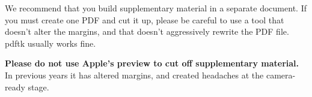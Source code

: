 \documentclass{article}
\begin{document}
    We recommend that you build supplementary material in a separate document.
    If you must create one PDF and cut it up, please be careful to use a tool that
    doesn't alter the margins, and that doesn't aggressively rewrite the PDF file.
    pdftk usually works fine.

    \textbf{Please do not use Apple's preview to cut off supplementary material.} In
    previous years it has altered margins, and created headaches at the camera-ready
    stage.
\end{document}
